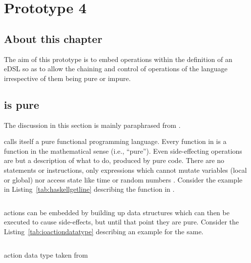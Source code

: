 \documentclass[thesis-solanki.tex]{subfiles}
\begin{document}
\chapter{Prototype 4}{\label{proto4}}


\section{About this chapter}
The aim of this prototype is to embed  operations within the definition of an eDSL so as to
allow the chaining and control of operations of the language irrespective of them being pure or impure.

\section{  is pure}

The discussion in this section is mainly paraphrased from \cite{website:ioispurechristaylor}.

 calls itself a pure functional programming language.
Every function in  is a function in the mathematical sense (i.e., ``pure'').
Even side-effecting  operations are but a description of what to do, produced by pure code.
There are no statements or instructions, only expressions which cannot mutate variables (local or global) nor
access state like time or random numbers \cite{website:haskellorg}.
Consider the example in Listing~\ref{tab:haskellgetline} describing the  function in
.

\begin{code-list}[H]
\begin{singlespace}
\inputminted{haskell}{haskell-proto4-haskell-getLine.hs}
\end{singlespace}
\caption{ }
\label{tab:haskellgetline}
\end{code-list}

 actions can be embedded by building up data structures which can then be executed to cause
side-effects, but until that point they are pure.
Consider the Listing~\ref{tab:ioactiondatatype} describing an example for the same.

\begin{code-list}[H]
\begin{singlespace}
\inputminted{haskell}{haskell-proto4-ioaction-datatype.hs}
\end{singlespace}
\caption{ action data type taken from \cite{website:ioispurechristaylor}}
\label{tab:ioactiondatatype}
\end{code-list}
\end{document}
